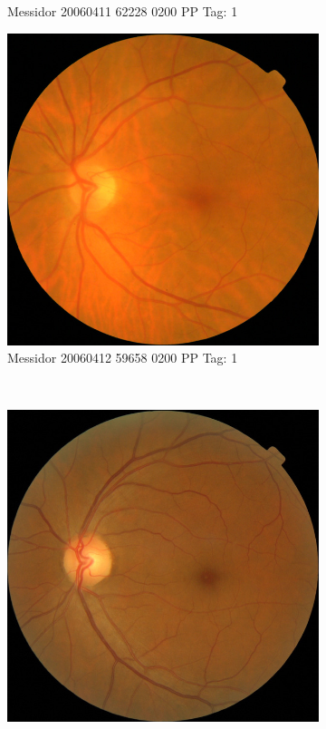 \begin{figure}[ht!]
\begin{subfigure}[b]{0.4\textwidth}
		\caption{Messidor 20060411 62228 0200 PP Tag: 1}		
	\end{subfigure}	
	\begin{subfigure}[b]{0.4\textwidth}
		\centering
		\includegraphics[width=\textwidth]{Figures/chapter_stability/20060412_59658_0200_PP/20060412_59658_0200_PP.jpeg}
		\caption{Messidor 20060412 59658 0200 PP Tag: 1}		
	\end{subfigure} ~
	\begin{subfigure}[b]{0.4\textwidth}
		\centering
		\includegraphics[width=\textwidth]{Figures/chapter_stability/20051020_44782_0100_PP/20051020_44782_0100_PP.jpeg}

\end{subfigure}
\end{figure}
